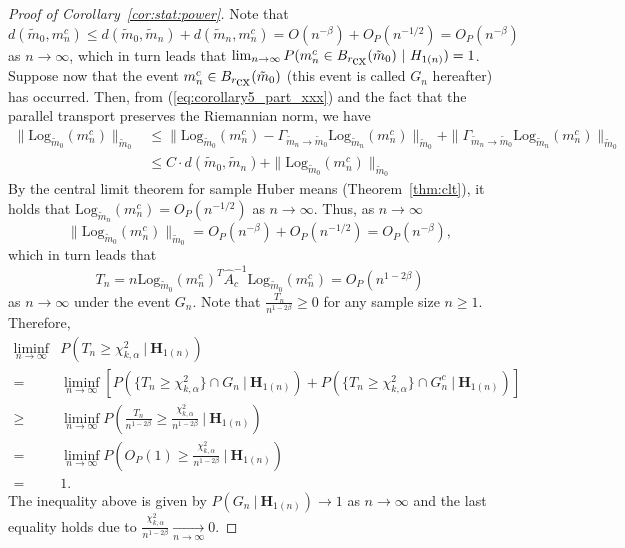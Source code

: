 \documentclass[preprint]{imsart}
\theoremstyle{plain}
\theoremstyle{remark}
\begin{document}
\begin{appendix}
\begin{proof}[Proof of Corollary~\ref{cor:stat:power}]
Note that $d(\tilde{m}_0, m_n^c) \le d(\tilde{m}_0, \tilde{m}_n) + d(\tilde{m}_n, m_n^c) = O(n^{-\beta}) + O_P(n^{-1/2}) = O_P(n^{-\beta})$ as $n \to \infty$, which in turn leads that 
$\lim_{n\to \infty}P(m_n^c \in B_{r_{\mbox{\tiny cx}}}(\tilde{m}_0) \ | \ \textbf{H}_{1(n)} ) = 1$. 
Suppose now that the event  $m_n^c \in B_{r_{\mbox{\tiny cx}}}(\tilde{m}_0)$ (this event is called $G_n$ hereafter) has occurred. Then, from (\ref{eq:corollary5_part_xxx}) and the fact that  the parallel transport preserves
the Riemannian norm, we have
\begin{align*}
    \|\mbox{Log}_{\tilde{m}_0} (m_n^c) \|_{\tilde{m}_0} 
    & \le 
    \| \mbox{Log}_{\tilde{m}_0}(m_n^c) - \Gamma_{\tilde{m}_n \to \tilde{m}_0} \mbox{Log}_{\tilde{m}_n}(m_n^c) \|_{\tilde{m}_0} 
    + \|\Gamma_{\tilde{m}_n \to \tilde{m}_0} \mbox{Log}_{\tilde{m}_n} (m_n^c) \|_{\tilde{m}_0}  \\
    & \le C \cdot
d(\tilde{m}_0,\tilde{m}_n)
    + \| \mbox{Log}_{\tilde{m}_0} (m_n^c) \|_{\tilde{m}_0} 
\end{align*}
By the central limit theorem for sample Huber means (Theorem~\ref{thm:clt}), it holds that
$\mbox{Log}_{\tilde{m}_n} (m_n^c) = O_P(n^{-1/2})$ as $n \to \infty$. Thus, as $n \to \infty$
$$\|\mbox{Log}_{\tilde{m}_0} (m_n^c) \|_{\tilde{m}_0} = O_P(n^{-\beta} ) + O_P(n^{-1/2}) = O_P(n^{-\beta}),$$ which in turn leads that 
$$T_{n} = n\mbox{Log}_{\tilde{m}_0}(m^{c}_{n})^{T}\hat{A}^{-1}_{c} \mbox{Log}_{\tilde{m}_0}(m^{c}_{n}) = O_{P}(n^{1-2\beta})$$
as $n \rightarrow \infty$ under the event $G_n$. 
Note that $\frac{T_{n}}{n^{1-2\beta}} \ge 0$ for any sample size $n \ge 1$. 
Therefore, 
\begin{align*}
\liminf_{n \rightarrow \infty} & P(T_{n} \ge \chi^{2}_{k, \alpha} \ | \ \mathbf{H}_{1(n)})  \\ 
 = & \liminf_{n \rightarrow \infty} \left[  P( \{ T_{n} \ge \chi^{2}_{k, \alpha} \} \cap G_n\ | \ \mathbf{H}_{1(n)}) + 
P( \{ T_{n} \ge \chi^{2}_{k, \alpha} \} \cap G_n^c\ | \ \mathbf{H}_{1(n)})\right] \\ 
 \ge & \liminf_{n \rightarrow \infty} P\left(\frac{T_{n}}{n^{1-2\beta}} \ge \frac{\chi^{2}_{k, \alpha}}{n^{1-2\beta}} \ | \ \textbf{H}_{1(n)}\right) \\
=& \liminf_{n \rightarrow \infty} P\left(O_{P}(1) \ge \frac{\chi^{2}_{k, \alpha}}{n^{1-2\beta}} \ | \ \textbf{H}_{1(n)}\right) \\ 
=& 1.
\end{align*}
The inequality above is given by $P(G_n \ | \ \textbf{H}_{1(n)} ) \to 1$ as $n \to \infty$ and the last equality holds due to $\frac{\chi^{2}_{k, \alpha}}{n^{1-2\beta}} \underset{n \to \infty}{\to} 0$.
\end{proof}







\end{appendix}
\end{document}
